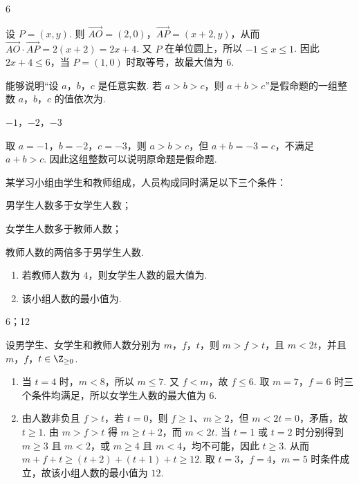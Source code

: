 \begin{answer}
6
\end{answer}

\begin{solution}
设 \(P=(x,y)\). 则 \(\overrightarrow{AO}=(2,0)\)，\(\overrightarrow{AP}=(x+2,y)\)，从而
\(\overrightarrow{AO}\cdot\overrightarrow{AP}=2(x+2)=2x+4\).
又 \(P\) 在单位圆上，所以 \(-1\le x\le1\). 因此 \(2x+4\le6\)，当 \(P=(1,0)\) 时取等号，故最大值为 \(6\).
\end{solution}

\begin{problem}
能够说明“设 \(a\)，\(b\)，\(c\) 是任意实数. 若 \(a>b>c\)，则 \(a+b>c\)”是假命题的一组整数 \(a\)，\(b\)，\(c\) 的值依次为\fillinblank{}.
\end{problem}

\begin{answer}
\(-1\)，\(-2\)，\(-3\)
\end{answer}

\begin{solution}
取 \(a=-1\)，\(b=-2\)，\(c=-3\)，则 \(a>b>c\)，但 \(a+b=-3=c\)，不满足 \(a+b>c\). 因此这组整数可以说明原命题是假命题.
\end{solution}

\begin{problem}
某学习小组由学生和教师组成，人员构成同时满足以下三个条件：

\begin{circlelist}
\item 男学生人数多于女学生人数；
\item 女学生人数多于教师人数；
\item 教师人数的两倍多于男学生人数.
\end{circlelist}
\begin{enumerate}
\item 若教师人数为 \(4\)，则女学生人数的最大值为\fillinblank{}.
\item 该小组人数的最小值为\fillinblank{}.
\end{enumerate}
\end{problem}

\begin{answer}
6；12
\end{answer}

\begin{solution}
设男学生、女学生和教师人数分别为 \(m\)，\(f\)，\(t\)，则 \(m>f>t\)，且 \(m<2t\)，并且 \(m\)，\(f\)，\(t\in\Z_{\ge0}\).

\begin{enumerate}
\item 当 \(t=4\) 时，\(m<8\)，所以 \(m\le7\). 又 \(f<m\)，故 \(f\le6\). 取 \(m=7\)，\(f=6\) 时三个条件均满足，所以女学生人数的最大值为 \(6\).
\item 由人数非负且 \(f>t\)，若 \(t=0\)，则 \(f\ge1\)、\(m\ge2\)，但 \(m<2t=0\)，矛盾，故 \(t\ge1\). 由 \(m>f>t\) 得 \(m\ge t+2\)，而 \(m<2t\). 当 \(t=1\) 或 \(t=2\) 时分别得到 \(m\ge3\) 且 \(m<2\)，或 \(m\ge4\) 且 \(m<4\)，均不可能，因此 \(t\ge3\). 从而 \(m+f+t\ge(t+2)+(t+1)+t\ge12\). 取 \(t=3\)，\(f=4\)，\(m=5\) 时条件成立，故该小组人数的最小值为 \(12\).
\end{enumerate}
\end{solution}

